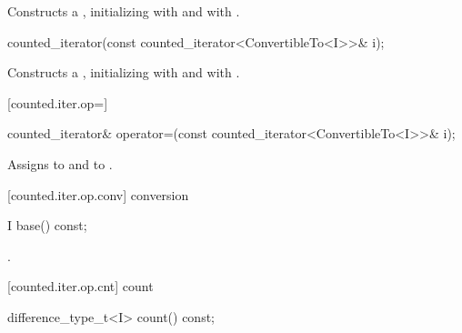 \begin{itemdescr}
\pnum
\requires {}

\pnum
\effects Constructs a , initializing
 with  and  with .
\end{itemdescr}

%
\begin{itemdecl}
counted_iterator(const counted_iterator<ConvertibleTo<I>>& i);
\end{itemdecl}

\begin{itemdescr}
\pnum
\effects Constructs a , initializing
 with  and  with .
\end{itemdescr}

[counted.iter.op=]{}

%
%
\begin{itemdecl}
counted_iterator& operator=(const counted_iterator<ConvertibleTo<I>>& i);
\end{itemdecl}

\begin{itemdescr}
\pnum
\effects Assigns  to
 and  to .

\end{itemdescr}

[counted.iter.op.conv]{ conversion}

%
%
\begin{itemdecl}
I base() const;
\end{itemdecl}

\begin{itemdescr}
\pnum
\returns {}.
\end{itemdescr}

[counted.iter.op.cnt]{ count}

%
%
\begin{itemdecl}
difference_type_t<I> count() const;
\end{itemdecl}

